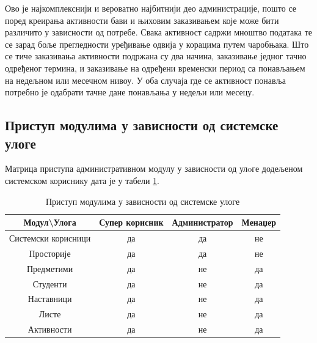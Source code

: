 \documentclass[a4paper, 12pt, diplomski]{etfcyr}
\makeatletter
\gdef\tshortstack{\@ifnextchar[\@tshortstack{\@tshortstack[c]}}
\let\@tshortstack\@shortstack
\makeatother
\begin{document}
\begin{justify}
\begin{labeling}{\smash{\tshortstack[l]{Управљање\\активностима}}}
						\item[\smash{\tshortstack[l]{Управљање\\активностима}}]
							\begin{justify}
								Ово је најкомплекснији и вероватно најбитнији део администрације, пошто се поред креирања активности бави и њиховим заказивањем које може бити различито у зависности од потребе. Свака активност садржи мноштво података те се зарад боље прегледности уређивање одвија у корацима путем чаробњака. Што се тиче заказивања активности подржана су два начина, заказивање једног тачно одређеног термина, и заказивање на одређени временски период са понављањем на недељном или месечном нивоу. У оба случаја где се активност понавља потребно је одабрати тачне дане понављања у недељи или месецу.
							\end{justify}

						\end{labeling}
				\end{justify}

			\newpage

			\subsection{Приступ модулима у зависности од системске улоге}
				\begin{justify}
					Матрица приступа административном модулу у зависности од улoге додељеном системском кориснику дата је у табели \ref{table:1}.
				\end{justify}
				\begin{table}[H]
					\centering
					\begin{tabular}{ c ||c|c|c }
						Модул\textbackslash Улога & Супер корисник & Администратор & Менаџер \\
						\hline\hline
						Системски корисници & да & да & не \\
						Просторије & да & да & не \\
						Предметими & да & не & да \\
						Студенти & да & не & да \\
						Наставници & да & не & да \\
						Листе & да & не & да \\
						Активности & да & не & да \\
					\end{tabular}
					\caption{Приступ модулима у зависности од системске улоге}
					\label{table:1}
				\end{table}
\end{document}

